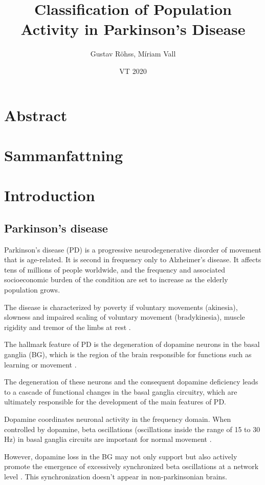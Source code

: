 \documentclass{article}
\title{Classification of Population Activity in Parkinson's Disease}
\author{Gustav Röhss, Míriam Vall}
\date{VT 2020}
\begin{document}
\maketitle

\section*{Abstract}
\section*{Sammanfattning}

\newpage
\tableofcontents

\newpage
\section{Introduction}

\subsection{Parkinson's disease}
Parkinson’s disease (PD) is a progressive neurodegenerative disorder of movement that is age-related. It is second in frequency only to Alzheimer’s disease. It affects tens of millions of people worldwide, and the frequency and associated socioeconomic burden of the condition are set to increase as the elderly population grows.

The disease is characterized by poverty if voluntary movements (akinesia), slowness and impaired scaling of voluntary movement (bradykinesia), muscle rigidity and tremor of the limbs at rest \citep{DeMaags}.

The hallmark feature of PD is the degeneration of dopamine neurons in the basal ganglia (BG), which is the region of the brain responsible for functions such as learning or movement \citep{Hammond}.

The degeneration of these neurons and the consequent dopamine deficiency leads to a cascade of functional changes in the basal ganglia circuitry, which are ultimately responsible for the development of the main features of PD. 

Dopamine coordinates neuronal activity in the frequency domain. When controlled by dopamine, beta oscillations (oscillations inside the range of 15 to 30 Hz) in basal ganglia circuits are important for normal movement \citep{Cagnan}. 

However, dopamine loss in the BG may not only support but also actively promote the emergence of excessively synchronized beta oscillations at a network level \citep{Cagnan}. This synchronization doesn’t appear in non-parkinsonian brains.
\end{document}
